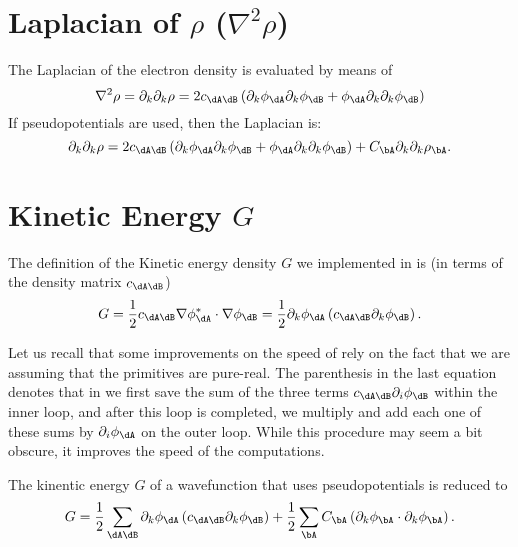 \section{Laplacian of $\rho$ ($\nabla^2\rho$)}

The Laplacian of the electron density is evaluated by means of
%
\begin{equation}
   \nabla^2\rho=\partial_k\partial_k\rho=2c_{\dA\dB}\left(\partial_k\phi_{\dA}\partial_k\phi_{\dB}+\phi_{\dA}\partial_k\partial_k\phi_{\dB}\right)
\end{equation}
%
If pseudopotentials are used, then the Laplacian is:
%
\begin{equation}%
   \partial_k\partial_k\rho=
   2c_{\dA\dB}\left(\partial_k\phi_{\dA}\partial_k\phi_{\dB}+
   \phi_{\dA}\partial_k\partial_k\phi_{\dB}\right)
   +C_{\bA}\partial_k\partial_k\rho_{\bA}.
\end{equation}
%


\section{Kinetic Energy $G$}

The definition of the Kinetic energy density $G$ we implemented in \DTK{} is (in terms of the density matrix $c_{\dA\dB}$)
%
\begin{equation}\label{eq:KinetEnergyGDef}
   G=\frac{1}{2}c_{\dA\dB}\nabla\phi_{\dA}^*\cdot\nabla\phi_{\dB}=\frac{1}{2}\partial_k\phi_{\dA}\left(c_{\dA\dB}\partial_k\phi_{\dB}\right).
\end{equation}
%

Let us recall that some improvements on the speed of \DTK{} rely on the fact that we are assuming that the primitives are pure-real. The parenthesis in the last equation denotes that in \DTK{} we first save the sum of the three terms $c_{\dA\dB}\partial_i\phi_{\dB}$ within the inner loop, and after this loop is completed, we multiply and add each one of these sums by $\partial_i\phi_{\dA}$ on the outer loop. While this procedure may seem a bit obscure, it improves the speed of the computations.

The kinentic energy $G$ of a wavefunction that uses pseudopotentials is reduced to
%
\begin{equation}%
  G=\frac{1}{2}\sum_{\dA\dB}\partial_k\phi_{\dA}\left(c_{\dA\dB}\partial_k\phi_{\dB}\right)
  +\frac{1}{2}\sum_{\bA}C_{\bA}\left( \partial_k\phi_{\bA}\cdot\partial_k\phi_{\bA} \right).
\end{equation}
%



